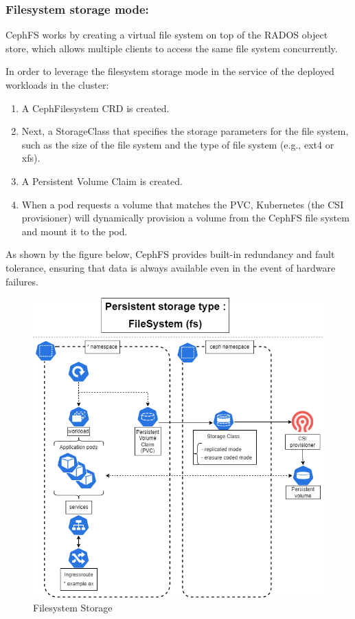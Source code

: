 \subsubsection{Filesystem storage mode: }

CephFS works by creating a virtual file system on top of the RADOS object store, which allows multiple clients to access the same file system concurrently. 

In order to leverage the filesystem storage mode in the service of the deployed workloads in the cluster: 
\begin{enumerate}[label = (\arabic*)]
    \item A CephFilesystem CRD is created. 
    \item Next, a StorageClass that specifies the storage parameters for the file system, such as the size of the file system and the type of file system (e.g., ext4 or xfs). 
    \item A Persistent Volume Claim is created. 
    \item When a pod requests a volume that matches the PVC, Kubernetes (the CSI provisioner) will dynamically provision a volume from the CephFS file system and mount it to the pod. 
\end{enumerate}
As shown by the figure below, CephFS provides built-in redundancy and fault tolerance, ensuring that data is always available even in the event of hardware failures. 
\begin{figure}[H]\centering
\includegraphics[width=1.0\textwidth,angle=00]{assets/f31.png}
\caption{Filesystem Storage}
\label{fig:Filesystem Storage}
\end{figure}

